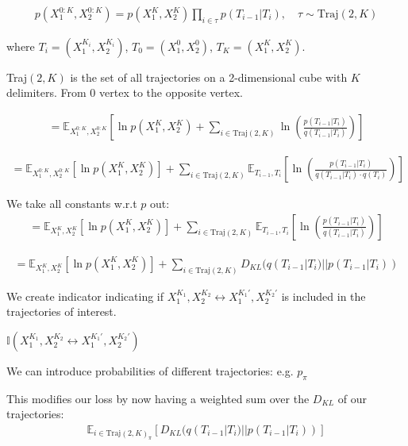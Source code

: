 \documentclass[11pt]{article}
\begin{document}
\begin{align}
p(X_1^{0:K}, X_2^{0:K}) = p(X_1^K, X_2^K) \prod_{i \in \tau} p(T_{i-1} | T_i), \quad \tau \sim \text{Traj}(2,K)
\end{align}

where $T_i = (X_1^{K_i}, X_2^{K_i})$, $T_0 = (X_1^0, X_2^0)$, $T_K = (X_1^K, X_2^K)$.

Traj$(2, K)$ is the set of all trajectories on a 2-dimensional cube with $K$ delimiters. From 0 vertex to the opposite vertex.

\begin{align}
= \mathbb{E}_{X_1^{0:K}, X_2^{0:K}} \left[ \ln p(X_1^K, X_2^K) + \sum_{i \in \text{Traj}(2,K)} \ln \left( \frac{p(T_{i-1} | T_i)}{q(T_{i-1} | T_i)} \right) \right]
\end{align}

\begin{align}
= \mathbb{E}_{X_1^{0:K}, X_2^{0:K}} \left[ \ln p(X_1^K, X_2^K) \right] + \sum_{i \in \text{Traj}(2,K)} \mathbb{E}_{T_{i-1}, T_i} \left[ \ln \left( \frac{p(T_{i-1} | T_i)}{q(T_{i-1} | T_i) \cdot q(T_i)} \right) \right]
\end{align}

We take all constants w.r.t $p$ out:
\begin{align}
= \mathbb{E}_{X_1^K, X_2^K} \left[ \ln p(X_1^K, X_2^K) \right] + \sum_{i \in \text{Traj}(2,K)} \mathbb{E}_{T_{i-1}, T_i} \left[ \ln \left( \frac{p(T_{i-1} | T_i)}{q(T_{i-1} | T_i)} \right) \right]
\end{align}

\begin{align}
= \mathbb{E}_{X_1^K, X_2^K} \left[ \ln p(X_1^K, X_2^K) \right] + \sum_{i \in \text{Traj}(2,K)} D_{KL}(q(T_{i-1} | T_i) || p(T_{i-1} | T_i))
\end{align}

We create indicator indicating if $X_1^{K_1}, X_2^{K_2} \leftrightarrow X_1^{K_1'}, X_2^{K_2'}$ is included in the trajectories of interest.

$\mathbb{I}(X_1^{K_1}, X_2^{K_2} \leftrightarrow X_1^{K_1'}, X_2^{K_2'})$

We can introduce probabilities of different trajectories: e.g. $p_\pi$

This modifies our loss by now having a weighted sum over the $D_{KL}$ of our trajectories:
\begin{align}
\mathbb{E}_{i \in \text{Traj}(2,K)_\pi} \left[ D_{KL}(q(T_{i-1} | T_i) || p(T_{i-1} | T_i)) \right]
\end{align}
\end{document}
